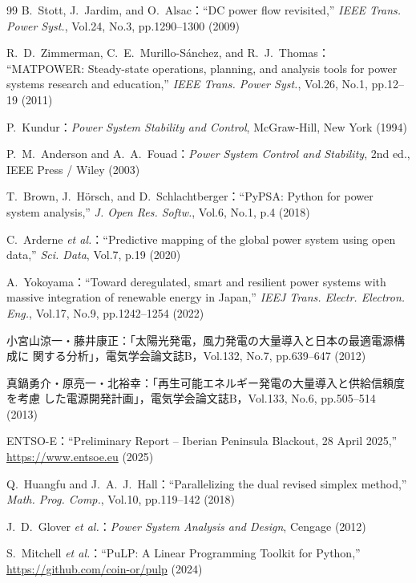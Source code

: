 \documentclass[fleqn]{ieej}
\begin{document}
{\begin{thebibliography}{99}
B.~Stott, J.~Jardim, and O.~Alsac：``DC power flow revisited,''
\textit{IEEE Trans. Power Syst.}, Vol.24, No.3, pp.1290--1300 (2009)

R.~D.~Zimmerman, C.~E.~Murillo-S\'{a}nchez, and R.~J.~Thomas：
``MATPOWER: Steady-state operations, planning, and analysis tools for power systems
research and education,''
\textit{IEEE Trans. Power Syst.}, Vol.26, No.1, pp.12--19 (2011)

P.~Kundur：\textit{Power System Stability and Control},
McGraw-Hill, New York (1994)

P.~M.~Anderson and A.~A.~Fouad：\textit{Power System Control and Stability},
2nd ed., IEEE Press / Wiley (2003)

T.~Brown, J.~H\"{o}rsch, and D.~Schlachtberger：``PyPSA: Python for power system
analysis,'' \textit{J. Open Res. Softw.}, Vol.6, No.1, p.4 (2018)

C.~Arderne \textit{et al.}：``Predictive mapping of the global power system using
open data,'' \textit{Sci. Data}, Vol.7, p.19 (2020)

A.~Yokoyama：``Toward deregulated, smart and resilient power systems with massive
integration of renewable energy in Japan,''
\textit{IEEJ Trans. Electr. Electron. Eng.}, Vol.17, No.9, pp.1242--1254 (2022)

小宮山涼一・藤井康正：「太陽光発電，風力発電の大量導入と日本の最適電源構成に
関する分析」，電気学会論文誌B，Vol.132, No.7, pp.639--647 (2012)

真鍋勇介・原亮一・北裕幸：「再生可能エネルギー発電の大量導入と供給信頼度を考慮
した電源開発計画」，電気学会論文誌B，Vol.133, No.6, pp.505--514 (2013)

ENTSO-E：``Preliminary Report -- Iberian Peninsula Blackout, 28 April 2025,''
\url{https://www.entsoe.eu} (2025)

Q.~Huangfu and J.~A.~J.~Hall：``Parallelizing the dual revised simplex method,''
\textit{Math. Prog. Comp.}, Vol.10, pp.119--142 (2018)

J.~D.~Glover \textit{et al.}：\textit{Power System Analysis and Design},
Cengage (2012)

S.~Mitchell \textit{et al.}：``PuLP: A Linear Programming Toolkit for Python,''
\url{https://github.com/coin-or/pulp} (2024)

\end{thebibliography}
} %
\end{document}
